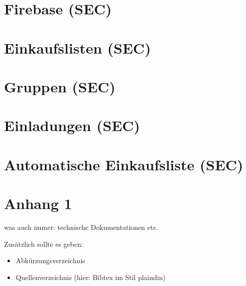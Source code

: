 \documentclass[
    headings=optiontotocandhead,%
    twoside,
    numbers=noenddot,%
    toc=flat, %
    12pt, %
    titlepage, %
    parskip=full, %
    listof=totoc, %
    listof=flat, %
    numbers=noenddot, %
    bibliography=totoc, %
    a4paper,DIV=14,
    BCOR=15mm,
]{scrbook}
\begin{document}
\chapter{Firebase (SEC)}
\renewcommand{\kapitelautor}{Autor: Tobias Seczer}


\chapter{Einkaufslisten (SEC)}
\renewcommand{\kapitelautor}{Autor: Tobias Seczer}


\chapter{Gruppen (SEC)}
\renewcommand{\kapitelautor}{Autor: Tobias Seczer}


\chapter{Einladungen (SEC)}
\renewcommand{\kapitelautor}{Autor: Tobias Seczer}

\chapter{Automatische Einkaufsliste (SEC)}
\renewcommand{\kapitelautor}{Autor: Tobias Seczer}


\appendix

\chapter{Anhang 1\label{chap:Anhang-1}}

was auch immer: technische Dokumentationen etc.

Zusätzlich sollte es geben:
\begin{itemize}
\item Abkürzungsverzeichnis
\item Quellenverzeichnis (hier: Bibtex im Stil plaindin)
\end{itemize}
\printindex{}

\raggedright %

\end{document}
